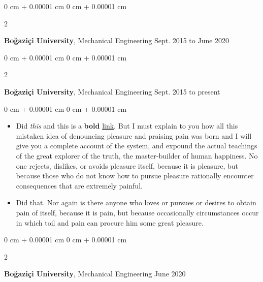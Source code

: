 \documentclass[10pt, letterpaper]{article}
\newenvironment{highlights}{
    \begin{itemize}[
        topsep=0.10 cm,
        parsep=0.10 cm,
        partopsep=0pt,
        itemsep=0pt,
        leftmargin=0 cm + 10pt
    ]
}{
    \end{itemize}
} %
\newenvironment{onecolentry}{
    \begin{adjustwidth}{
        0 cm + 0.00001 cm
    }{
        0 cm + 0.00001 cm
    }
}{
    \end{adjustwidth}
} %
\newenvironment{twocolentry}[2][]{
    \onecolentry
    \def\secondColumn{#2}
    \setcolumnwidth{\fill, 4.5 cm}
    \begin{paracol}{2}
}{
    \switchcolumn \raggedleft \secondColumn
    \end{paracol}
    \endonecolentry
} %
\begin{document}
        \begin{twocolentry}{
            Sept. 2015 to June 2020
        }
            \textbf{Boğaziçi University}, Mechanical Engineering\end{twocolentry}



        \vspace{0.2 cm}

        \begin{twocolentry}{
            Sept. 2015 to present
        }
            \textbf{Boğaziçi University}, Mechanical Engineering\end{twocolentry}

        \vspace{0.10 cm}
        \begin{onecolentry}
            \begin{highlights}
                \item Did \textit{this} and this is a \textbf{bold} \href{https://example.com}{link}. But I must explain to you how all this mistaken idea of denouncing pleasure and praising pain was born and I will give you a complete account of the system, and expound the actual teachings of the great explorer of the truth, the master-builder of human happiness. No one rejects, dislikes, or avoids pleasure itself, because it is pleasure, but because those who do not know how to pursue pleasure rationally encounter consequences that are extremely painful.
                \item Did that. Nor again is there anyone who loves or pursues or desires to obtain pain of itself, because it is pain, but because occasionally circumstances occur in which toil and pain can procure him some great pleasure.
            \end{highlights}
        \end{onecolentry}


        \vspace{0.2 cm}

        \begin{twocolentry}{
            June 2020
        }
            \textbf{Boğaziçi University}, Mechanical Engineering\end{twocolentry}
\end{document}
